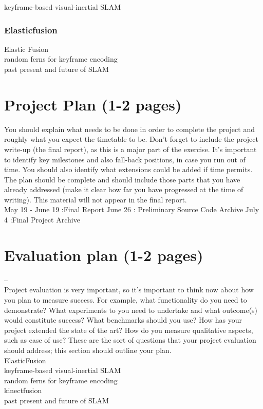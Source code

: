 \documentclass[12pt,twoside]{article}
\begin{document}
keyframe-based visual-inertial SLAM \cite{leutenegger2015keyframe}\\


\subsubsection{Elasticfusion}

Elastic Fusion \cite{whelan2015elasticfusion}\\

random ferns for keyframe encoding \cite{glocker2015real}\\

past present and future of SLAM \cite{cadena2016past}\\




\section{Project Plan (1-2 pages)}

You should explain what needs to be done in order to complete the project and roughly what you expect the timetable to be. Don’t forget to include the project write-up (the final report), as this is a major part of the exercise. It’s important to identify key milestones and also fall-back positions, in case you run out of time.  You should also identify what extensions could be added if time permits.  The plan should be complete and should include those parts that you have already addressed (make it clear how far you have progressed at the time of writing).  This material will not appear in the final report.\\

May 19 - June 19 :Final Report
June 26 : Preliminary Source Code Archive
July 4 :Final Project Archive


\section{Evaluation plan (1-2 pages)}

--\\
Project evaluation is very important, so it's important to think now about how you plan to measure success. For example, what functionality do you need to demonstrate?  What experiments to you need to undertake and what outcome(s) would constitute success?  What benchmarks should you use? How has your project extended the state of the art?  How do you measure qualitative aspects, such as ease of use?  These are the sort of questions that your project evaluation should address; this section should outline your plan.\\

\newpage
ElasticFusion \cite{whelan2015elasticfusion}\\
keyframe-based visual-inertial SLAM \cite{leutenegger2015keyframe}\\
random ferns for keyframe encoding \cite{glocker2015real}\\
kinectfusion \cite{newcombe2011kinectfusion}\\
past present and future of SLAM \cite{cadena2016past}\\



\end{document}
